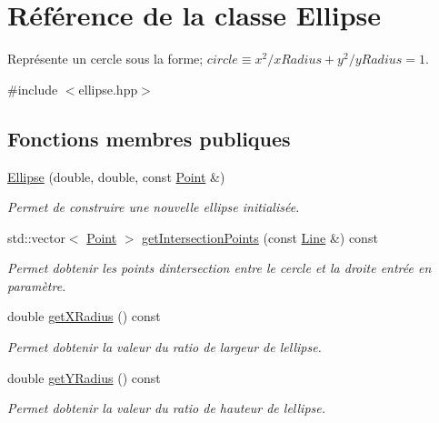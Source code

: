 \hypertarget{classEllipse}{}\section{Référence de la classe Ellipse}
\label{classEllipse}


Représente un cercle sous la forme; $ circle \equiv x^2/xRadius + y^2/yRadius = 1 $.  




{\ttfamily \#include $<$ellipse.\+hpp$>$}

\subsection*{Fonctions membres publiques}
\begin{DoxyCompactItemize}
\item 
\hyperlink{classEllipse_a2a12c8803bc8da1c04cd92345b7777f2}{Ellipse} (double, double, const \hyperlink{classPoint}{Point} \&)
\begin{DoxyCompactList}\small\item\em Permet de construire une nouvelle ellipse initialisée. \end{DoxyCompactList}\item 
std\+::vector$<$ \hyperlink{classPoint}{Point} $>$ \hyperlink{classEllipse_ab289196af0dafd510d44c6bb342c0f27}{get\+Intersection\+Points} (const \hyperlink{classLine}{Line} \&) const 
\begin{DoxyCompactList}\small\item\em Permet d\textquotesingle{}obtenir les points d\textquotesingle{}intersection entre le cercle et la droite entrée en paramètre. \end{DoxyCompactList}\item 
double \hyperlink{classEllipse_abbaadd47aa6c03e34ded7796afe18a26}{get\+X\+Radius} () const 
\begin{DoxyCompactList}\small\item\em Permet d\textquotesingle{}obtenir la valeur du ratio de largeur de l\textquotesingle{}ellipse. \end{DoxyCompactList}\item 
double \hyperlink{classEllipse_a984b6d3bde72676afca7889f90d5eedd}{get\+Y\+Radius} () const 
\begin{DoxyCompactList}\small\item\em Permet d\textquotesingle{}obtenir la valeur du ratio de hauteur de l\textquotesingle{}ellipse. \end{DoxyCompactList}\item 

\end{DoxyCompactItemize}
